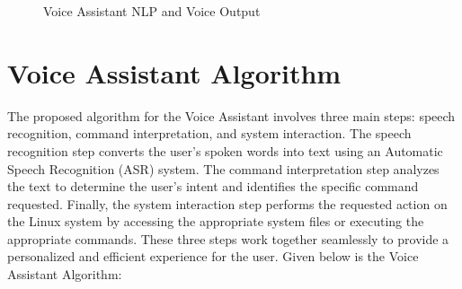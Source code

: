 \documentclass[conference]{IEEEtran}
\begin{document}
\begin{figure}
\centering
{}
\caption{Voice Assistant NLP and Voice Output}
\end{figure}


\section{Voice Assistant Algorithm}
The proposed algorithm for the Voice Assistant involves three main steps: speech recognition, command interpretation, and system interaction. The speech recognition step converts the user's spoken words into text using an Automatic Speech Recognition (ASR) system. The command interpretation step analyzes the text to determine the user's intent and identifies the specific command requested. Finally, the system interaction step performs the requested action on the Linux system by accessing the appropriate system files or executing the appropriate commands. These three steps work together seamlessly to provide a personalized and efficient experience for the user. Given below is the Voice Assistant Algorithm:
\end{document}
